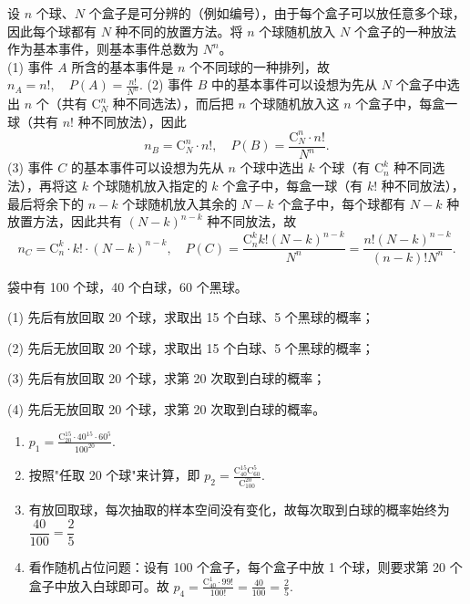 \documentclass[lang=cn,11pt]{elegantbook}
\begin{document}
\begin{solution}
设 \(n\) 个球、\(N\) 个盒子是可分辨的（例如编号），由于每个盒子可以放任意多个球，因此每个球都有 \(N\) 种不同的放置方法。将 \(n\) 个球随机放入 \(N\) 个盒子的一种放法作为基本事件，则基本事件总数为 \(N^n\)。\\
(1) 事件 \(A\) 所含的基本事件是 \(n\) 个不同球的一种排列，故
\(
n_A = n!, \quad P(A) = \frac{n!}{N^n}.
\)
(2) 事件 \(B\) 中的基本事件可以设想为先从 \(N\) 个盒子中选出 \(n\) 个（共有 \(\mathrm{C}_N^n\) 种不同选法），而后把 \(n\) 个球随机放入这 \(n\) 个盒子中，每盒一球（共有 \(n!\) 种不同放法），因此
\[
n_B = \mathrm{C}_N^n \cdot n!, \quad P(B) = \frac{\mathrm{C}_N^n \cdot n!}{N^n}.
\]
(3) 事件 \(C\) 的基本事件可以设想为先从 \(n\) 个球中选出 \(k\) 个球（有 \(\mathrm{C}_n^k\) 种不同选法），再将这 \(k\) 个球随机放入指定的 \(k\) 个盒子中，每盒一球（有 \(k!\) 种不同放法），最后将余下的 \(n-k\) 个球随机放入其余的 \(N-k\) 个盒子中，每个球都有 \(N-k\) 种放置方法，因此共有 \((N-k)^{n-k}\) 种不同放法，故
\[
n_C = \mathrm{C}_n^k \cdot k! \cdot (N-k)^{n-k}, \quad P(C) = \frac{\mathrm{C}_n^k k! (N-k)^{n-k}}{N^n} = \frac{n! (N-k)^{n-k}}{(n-k)! N^n}.
\]
\end{solution}


\begin{exercise}\label{exer:1-6}
袋中有 100 个球，40 个白球，60 个黑球。\par
(1) 先后有放回取 20 个球，求取出 15 个白球、5 个黑球的概率；\par
(2) 先后无放回取 20 个球，求取出 15 个白球、5 个黑球的概率；\par
(3) 先后有放回取 20 个球，求第 20 次取到白球的概率；\par
(4) 先后无放回取 20 个球，求第 20 次取到白球的概率。
\end{exercise}
\begin{solution}
\begin{enumerate}
    \item \(p_1 = \frac{\mathrm{C}_{20}^{15} \cdot 40^{15} \cdot 60^{5}}{100^{20}}.\)
    \item 按照"任取 20 个球"来计算，即
    \(p_2 = \frac{\mathrm{C}_{40}^{15} \mathrm{C}_{60}^{5}}{\mathrm{C}_{100}^{20}}.\)
    \item 有放回取球，每次抽取的样本空间没有变化，故每次取到白球的概率始终为 \(\dfrac{40}{100} = \dfrac{2}{5}\)
    \item 看作随机占位问题：设有 100 个盒子，每个盒子中放 1 个球，则要求第 20 个盒子中放入白球即可。故
    \(
    p_4 = \frac{\mathrm{C}_{40}^1 \cdot 99!}{100!} = \frac{40}{100} = \frac{2}{5}.
    \)
\end{enumerate}
\end{solution}
\end{document}
